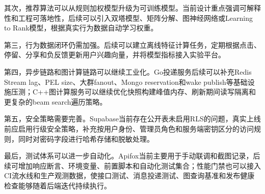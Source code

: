 其次，推荐算法可以从规则加权模型升级为可训练模型。当前设计重点强调可解释性和工程可落地性，后续可以引入双塔模型、矩阵分解、图神经网络或Learning to Rank模型，根据真实行为数据自动学习权重。

第三，行为数据闭环仍需加强。后续可以建立离线特征计算任务，定期根据点击、停留、分享和负反馈更新用户兴趣向量，并将模型指标接入实验平台。

第四，异步链路和图计算链路可以继续工业化。Go投递服务后续可以补充Redis Stream lag、PEL size、大群fanout、Mongo reservation和wake publish等基础设施压测；C++图计算服务可以继续优化快照构建峰值内存、刷新期间读写隔离和更复杂的beam search遍历策略。

第五，安全策略需要完善。Supabase当前存在公开表未启用RLS的问题，真实上线前应启用行级安全策略，补充按用户身份、管理员角色和服务端密钥区分的访问规则，同时对密码字段进行哈希存储和脱敏处理。

最后，测试体系可以进一步自动化。Apifox当前主要用于手动联调和截图记录，后续可增加响应断言、环境变量、前置脚本和自动化测试集合；性能门禁也可以接入CI流水线和生产观测数据，使接口测试、消息投递测试、图查询基准和发布健康检查能够随着后端迭代持续执行。
